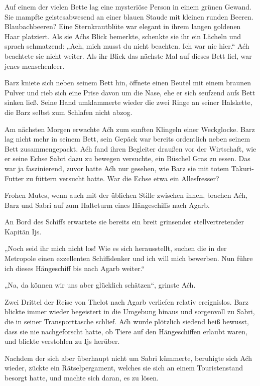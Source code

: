 Auf einem der vielen Bette lag eine mysteriöse Person in einem grünen Gewand. Sie mampfte geistesabwesend an einer blauen Staude mit kleinen runden Beeren. Blaubachbeeren? Eine Sternkrautblüte war elegant in ihrem langen goldenen Haar platziert. Als sie Aćhs Blick bemerkte, schenkte sie ihr ein Lächeln und sprach schmatzend: „Ach, mich musst du nicht beachten. Ich war nie hier.“ Aćh beachtete sie nicht weiter. Als ihr Blick das nächste Mal auf dieses Bett fiel, war jenes menschenleer.

Barz kniete sich neben seinem Bett hin, öffnete einen Beutel mit einem braunen Pulver und rieb sich eine Prise davon um die Nase, ehe er sich seufzend aufs Bett sinken ließ. Seine Hand umklammerte wieder die zwei Ringe an seiner Halskette, die Barz selbst zum Schlafen nicht abzog.

Am nächsten Morgen erwachte Aćh zum sanften Klingeln einer Weckglocke. Barz lag nicht mehr in seinem Bett, sein Gepäck war bereits ordentlich neben seinem Bett zusammengepackt. Aćh fand ihren Begleiter draußen vor der Wirtschaft, wie er seine Echse Sabri dazu zu bewegen versuchte, ein Büschel Gras zu essen. Das war ja faszinierend, zuvor hatte Aćh nur gesehen, wie Barz sie mit totem Takuri-Futter zu füttern versucht hatte. War die Echse etwa ein Allesfresser?

Frohen Mutes, wenn auch mit der üblichen Stille zwischen ihnen, brachen Aćh, Barz und Sabri auf zum Halteturm eines Hängeschiffs nach Agarb.

An Bord des Schiffs erwartete sie bereits ein breit grinsender stellvertretender Kapitän Ijs.

„Noch seid ihr mich nicht los! Wie es sich herausstellt, suchen die in der Metropole einen exzellenten Schiffslenker und ich will mich bewerben. Nun führe ich dieses Hängeschiff bis nach Agarb weiter.“

„Na, da können wir uns aber glücklich schätzen“, grinste Aćh.\bigskip







Zwei Drittel der Reise von Thelot nach Agarb verliefen relativ ereignislos. Barz blickte immer wieder begeistert in die Umgebung hinaus und sorgenvoll zu Sabri, die in seiner Transporttasche schlief. Aćh wurde plötzlich siedend heiß bewusst, dass sie nie nachgeforscht hatte, ob Tiere auf den Hängeschiffen erlaubt waren, und blickte verstohlen zu Ijs herüber.

Nachdem der sich aber überhaupt nicht um Sabri kümmerte, beruhigte sich Aćh wieder, zückte ein Rätselpergament, welches sie sich an einem Touristenstand besorgt hatte, und machte sich daran, es zu lösen.

